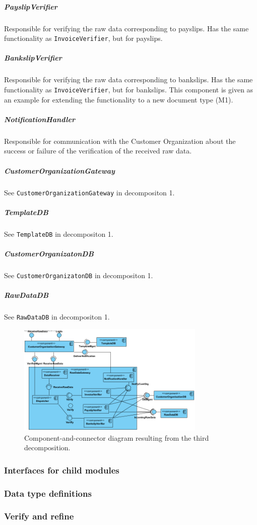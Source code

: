 \documentclass[a4paper,10pt]{article}
\begin{document}
\subparagraph{PayslipVerifier} Responsible for verifying the raw data corresponding to payslips. Has the same functionality as \texttt{InvoiceVerifier}, but for payslips.

\subparagraph{BankslipVerifier} Responsible for verifying the raw data corresponding to bankslips. Has the same functionality as \texttt{InvoiceVerifier}, but for bankslips. This component is given as an example for extending the functionality to a new document type (M1).

\subparagraph{NotificationHandler} Responsible for communication with the Customer Organization about the success or failure of the verification of the received raw data.

\subparagraph{CustomerOrganizationGateway} See \texttt{CustomerOrganizationGateway} in decompositon 1.

\subparagraph{TemplateDB} See \texttt{TemplateDB} in decompositon 1.
\subparagraph{CustomerOrganizatonDB} See \texttt{CustomerOrganizatonDB} in decompositon 1.
\subparagraph{RawDataDB} See \texttt{RawDataDB} in decompositon 1.

\begin{figure}[!htp]
	\centering
	\includegraphics[width=0.8\textwidth]{RawDataGateway.png}
	\caption{Component-and-connector diagram resulting from the third decomposition.
	}\label{fig:compandcondecomp3}
\end{figure}

\subsubsection{Interfaces for child modules}
\subsubsection{Data type definitions}
\subsubsection{Verify and refine}
\end{document}
